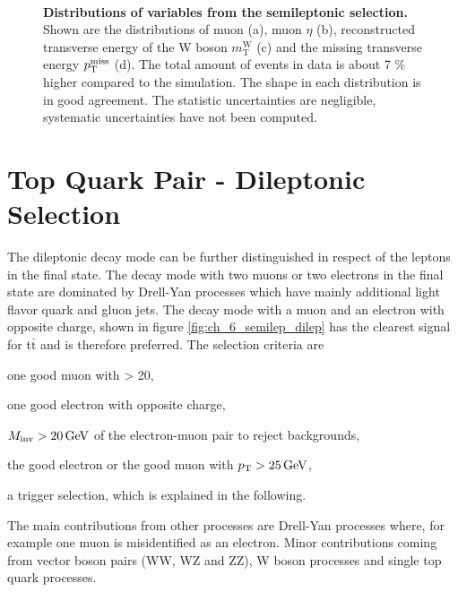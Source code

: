 \begin{figure}[!ht]
\begin{minipage}{\textwidth}
   \end{minipage}\\[1em]
	\caption[Distributions of Variables from the Semileptonic Selection]{\textbf{Distributions of variables from the semileptonic selection.} Shown are the distributions of muon \pt (a), muon $\eta$ (b), reconstructed transverse energy of the W boson $m^\textrm{W}_\textrm{T}$ (c) and the missing transverse energy $p_\mathrm{T}^\textrm{miss}$ (d). The total amount of events in data is about 7 \% higher compared to the simulation. The shape in each distribution is in good agreement. The statistic uncertainties are negligible, systematic uncertainties have not been computed.}
	\label{fig:ch_6_semilepDist}
\end{figure}


\section{Top Quark Pair - Dileptonic  Selection} \label{sec:ch_6_dilep}
The dileptonic decay mode can be further distinguished in respect of the leptons in the final state. The decay mode with two muons or two electrons in the final state are dominated by Drell-Yan processes which have mainly additional light flavor quark and gluon jets. The decay mode with a muon and an electron with opposite charge, shown in figure \ref{fig:ch_6_semilep_dilep} has the clearest signal for t$\bar{\textrm{t}}$ and is therefore preferred. The selection criteria are
\begin{description}
\setlength{\itemsep}{-20pt}
\item[•] one good muon with \pt > 20,\\
\item[•] one good electron with opposite charge,\\
\item[•] $M_\textrm{inv} > 20\,\mathrm{GeV}$ of the electron-muon pair to reject backgrounds,\\
\item[•] the good electron or the good muon with $p_\mathrm{T} > 25\,\mathrm{GeV}$,\\
\item[•] a trigger selection, which is explained in the following.
\end{description}
The main contributions from other processes are Drell-Yan processes where, for example one muon is misidentified as an electron. Minor contributions coming from vector boson pairs (WW, WZ and ZZ), W boson processes and single top quark processes. 

